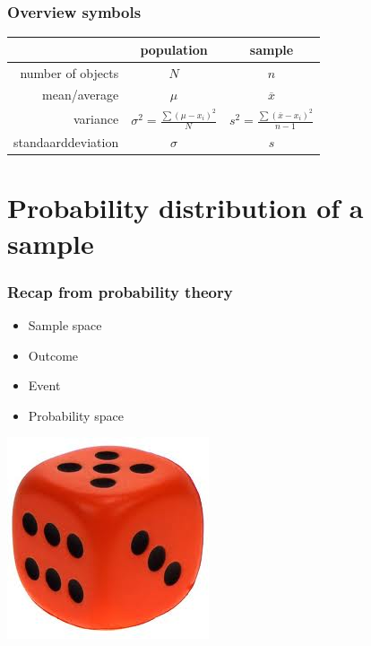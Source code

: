 \documentclass{beamer}
\begin{document}
\begin{frame}
\frametitle{Overview symbols}

{\tabulinesep=1.2mm
    \begin{tabu}{|r|c|c|}
        \hline
        & population & sample \\
        \hline
        number of objects & $N$ & $n$ \\
        \hline
        mean/average & $\mu$ & $\overline{x}$ \\
        \hline
        variance & $\sigma^2 = \frac{\sum (\mu-x_i)^2}{N}$ & $s^2  = \frac{\sum (\overline{x}-x_i)^2}{n-1}$ \\
        \hline
        standaarddeviation & $\sigma$ & $s$ \\
        \hline
\end{tabu}}
\end{frame}

\section{Probability distribution of a sample}

\begin{frame}
  \frametitle{Recap from probability theory}

  \begin{itemize}
    \item Sample space
    \item Outcome
    \item Event
    \item Probability space
  \end{itemize}

  \vfill

  \hfill \includegraphics[width=.2\textwidth]{img/les04-dobbelsteen}
\end{frame}
\end{document}
